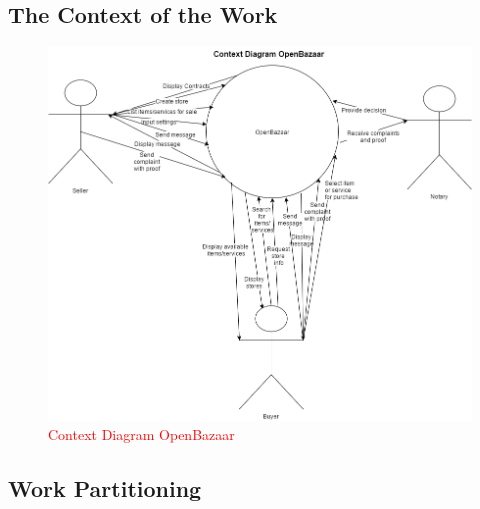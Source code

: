 \documentclass{article}
\begin{document}
\subsection{The Context of the Work}
\begin{figure}[h!]
\includegraphics[scale=0.5]{ContextDiagramOpenBazaar}
\caption{\textcolor{red}{Context Diagram OpenBazaar}}
\end{figure}

\subsection{Work Partitioning}
\end{document}
